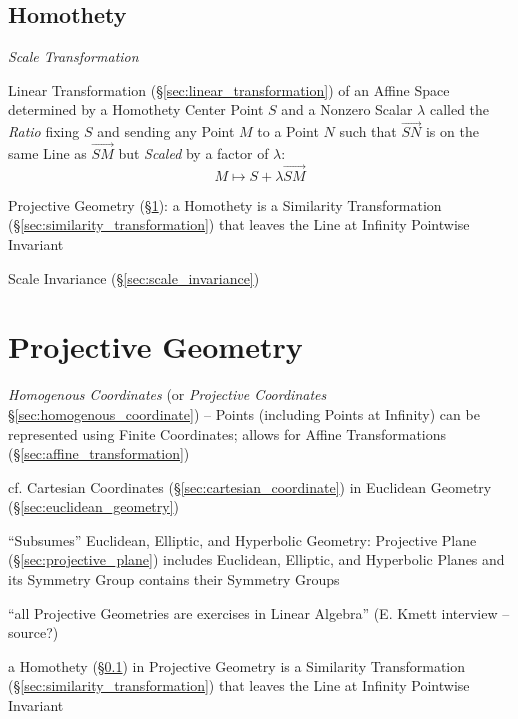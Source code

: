 \subsection{Homothety}\label{sec:homothety}

\emph{Scale Transformation}

Linear Transformation (\S\ref{sec:linear_transformation}) of an Affine Space
determined by a Homothety Center Point $S$ and a Nonzero Scalar $\lambda$
called the \emph{Ratio} fixing $S$ and sending any Point $M$ to a Point $N$
such that $\vec{SN}$ is on the same Line as $\vec{SM}$ but \emph{Scaled} by a
factor of $\lambda$:
\[
  M \mapsto S + \lambda\vec{SM}
\]

\fist Projective Geometry (\S\ref{sec:projective_geometry}): a Homothety is a
Similarity Transformation (\S\ref{sec:similarity_transformation}) that leaves
the Line at Infinity Pointwise Invariant

\fist Scale Invariance (\S\ref{sec:scale_invariance})



\section{Projective Geometry}\label{sec:projective_geometry}

\emph{Homogenous Coordinates} (or \emph{Projective Coordinates}
\S\ref{sec:homogenous_coordinate}) -- Points (including Points at Infinity) can
be represented using Finite Coordinates; allows for Affine Transformations
(\S\ref{sec:affine_transformation})

cf. Cartesian Coordinates (\S\ref{sec:cartesian_coordinate}) in
Euclidean Geometry (\S\ref{sec:euclidean_geometry})

``Subsumes'' Euclidean, Elliptic, and Hyperbolic Geometry: Projective
Plane (\S\ref{sec:projective_plane}) includes Euclidean, Elliptic, and
Hyperbolic Planes and its Symmetry Group contains their Symmetry
Groups

``all Projective Geometries are exercises in Linear Algebra'' (E.
Kmett interview -- source?) %

a Homothety (\S\ref{sec:homothety}) in Projective Geometry is a Similarity
Transformation (\S\ref{sec:similarity_transformation}) that leaves the Line at
Infinity Pointwise Invariant



